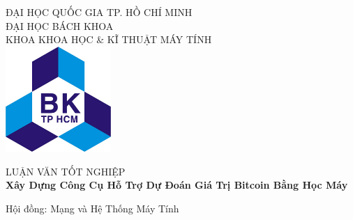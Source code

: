 


\begin{titlepage}

\newcommand{\HRule}{\rule{\linewidth}{0.5mm}} %

\center %
 

\textsc{\Large ĐẠI HỌC QUỐC GIA TP. HỒ CHÍ MINH}\\[0.25cm] %
\textsc{\Large ĐẠI HỌC BÁCH KHOA}\\[0.25cm] %
\textsc{\large KHOA KHOA HỌC \& KĨ THUẬT MÁY TÍNH}\\[0.4cm] %
\vspace{1cm}
\includegraphics[width=0.3\textwidth]{BK.jpg}\\[0.4cm]
\vspace{1cm}

\textsc{\Large{LUẬN VĂN TỐT NGHIỆP}}\\[0.5cm] 

{ \Large \bfseries Xây Dựng Công Cụ Hỗ Trợ Dự Đoán Giá Trị Bitcoin Bằng Học Máy}\\[0.7cm] %
\begin{flushright}
\vspace{1cm}
\large Hội đồng: Mạng và Hệ Thống Máy Tính
\end{flushright}
 


\end{titlepage}
